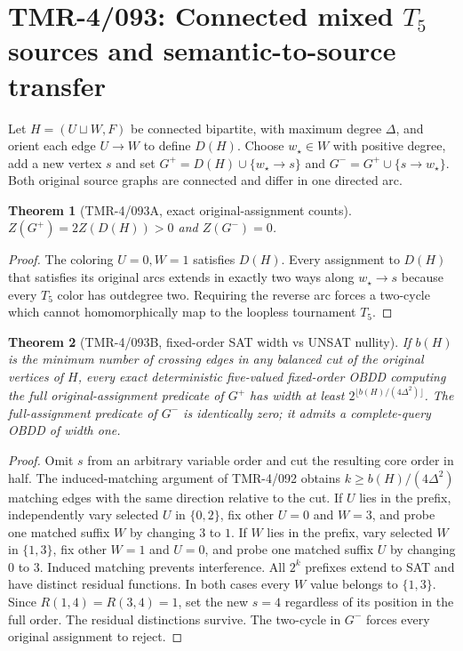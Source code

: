\documentclass[11pt]{article}
\newtheorem{theorem}{Theorem}
\begin{document}
\section{TMR-4/093: Connected mixed $T_5$ sources and semantic-to-source transfer}
Let $H=(U\sqcup W,F)$ be connected bipartite, with maximum degree
$\Delta$, and orient each edge $U\to W$ to define $D(H)$.
Choose $w_\star\in W$ with positive degree, add a new vertex $s$ and set
$G^+=D(H)\cup\{w_\star\to s\}$ and
$G^-=G^+\cup\{s\to w_\star\}$.
Both original source graphs are connected and differ in one directed arc.
\begin{theorem}[TMR-4/093A, exact original-assignment counts]
$Z(G^+)=2Z(D(H))>0$ and $Z(G^-)=0$.
\end{theorem}
\begin{proof}
The coloring $U=0,W=1$ satisfies $D(H)$.
Every assignment to $D(H)$ that satisfies its original arcs extends
in exactly two ways along $w_\star\to s$ because every $T_5$
color has outdegree two. Requiring the reverse arc forces a two-cycle
which cannot homomorphically map to the loopless tournament $T_5$.
\end{proof}
\begin{theorem}[TMR-4/093B, fixed-order SAT width vs UNSAT nullity]
If $b(H)$ is the minimum number of crossing edges in any balanced
cut of the original vertices of $H$, every exact deterministic
five-valued fixed-order OBDD computing the full original-assignment
predicate of $G^+$ has width at least
$2^{\lfloor b(H)/(4\Delta^2)\rfloor}$.
The full-assignment predicate of $G^-$ is identically zero; it
admits a complete-query OBDD of width one.
\end{theorem}
\begin{proof}
Omit $s$ from an arbitrary variable order and cut the resulting core
order in half. The induced-matching argument of TMR-4/092 obtains
$k\ge b(H)/(4\Delta^2)$ matching edges with the same direction
relative to the cut. If $U$ lies in the prefix, independently vary
selected $U$ in $\{0,2\}$, fix other $U=0$ and $W=3$,
and probe one matched suffix $W$ by changing $3$ to $1$.
If $W$ lies in the prefix, vary selected $W$ in $\{1,3\}$,
fix other $W=1$ and $U=0$, and probe one matched suffix $U$
by changing $0$ to $3$. Induced matching prevents interference.
All $2^k$ prefixes extend to SAT and have distinct residual functions.
In both cases every $W$ value belongs to $\{1,3\}$.
Since $R(1,4)=R(3,4)=1$, set the new $s=4$ regardless
of its position in the full order. The residual distinctions survive.
The two-cycle in $G^-$ forces every original assignment to reject.
\end{proof}
\end{document}
